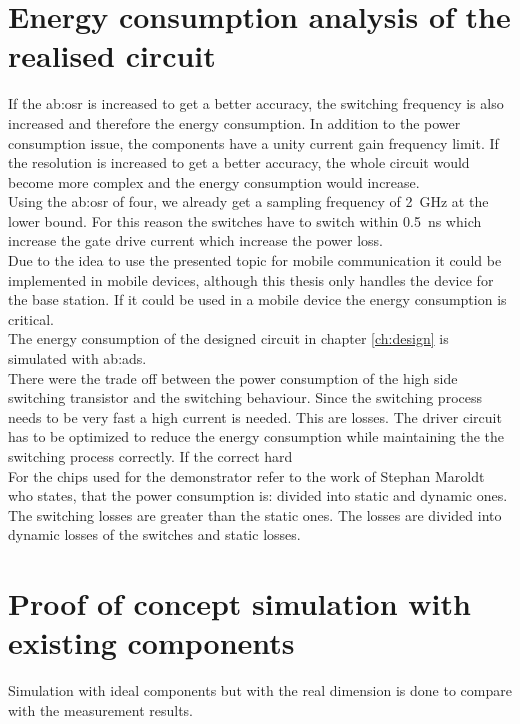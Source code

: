 \section{Energy consumption analysis of the realised circuit}
If the \gls{ab:osr} is increased to get a better accuracy, the switching frequency is also increased and therefore the energy consumption.
In addition to the power consumption issue, the components have a unity current gain frequency limit.
If the resolution is increased to get a better accuracy, the whole circuit would become more complex and the energy consumption would increase.\\
Using the \gls{ab:osr} of four, we already get a sampling frequency of \SI{2}{GHz} at the lower bound.
For this reason the switches have to switch within \SI{0.5}{\nano \second} which increase the gate drive current which increase the power loss.\\
Due to the idea to use the presented topic for mobile communication it could be implemented in mobile devices, although this thesis only handles the device for the base station. If it could be used in a mobile device the energy consumption is critical.\\
The energy consumption of the designed circuit in chapter \ref{ch:design} is simulated with \gls{ab:ads}.\\
There were the trade off between the power consumption of the high side switching transistor and the switching behaviour.
Since the switching process needs to be very fast a high current is needed.
This are losses.
The driver circuit has to be optimized to reduce the energy consumption while maintaining the the switching process correctly.
If the correct hard 
\\
 For the chips used for the demonstrator refer to the work of Stephan Maroldt who states, that the power consumption is:  divided into static and dynamic ones. The switching losses are greater than the static ones.
The losses are divided into dynamic losses of the switches and static losses.

\section{Proof of concept simulation with existing components}
\label{ch:ProofOfConceptWithExistingComponents}
Simulation with ideal components but with the real dimension is done to compare with the measurement results. 

